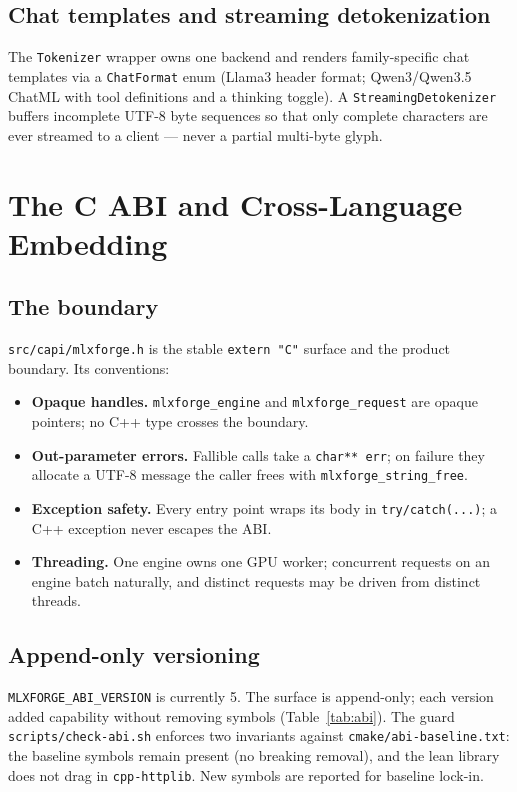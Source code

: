 \documentclass[11pt,a4paper]{report}
\newcommand{\code}[1]{\texttt{#1}}
\begin{document}
\section{Chat templates and streaming detokenization}
The \code{Tokenizer} wrapper owns one backend and renders family-specific chat
templates via a \code{ChatFormat} enum (Llama3 header format; Qwen3/Qwen3.5 ChatML
with tool definitions and a thinking toggle). A \code{StreamingDetokenizer} buffers
incomplete UTF-8 byte sequences so that only complete characters are ever streamed
to a client --- never a partial multi-byte glyph.

\chapter{The C ABI and Cross-Language Embedding}
\label{ch:abi}

\section{The boundary}
\code{src/capi/mlxforge.h} is the stable \code{extern "C"} surface and the product
boundary. Its conventions:
\begin{itemize}[nosep]
  \item \textbf{Opaque handles.} \code{mlxforge\_engine} and \code{mlxforge\_request}
        are opaque pointers; no C++ type crosses the boundary.
  \item \textbf{Out-parameter errors.} Fallible calls take a \code{char** err}; on
        failure they allocate a UTF-8 message the caller frees with
        \code{mlxforge\_string\_free}.
  \item \textbf{Exception safety.} Every entry point wraps its body in
        \code{try/catch(...)}; a C++ exception never escapes the ABI.
  \item \textbf{Threading.} One engine owns one GPU worker; concurrent requests on an
        engine batch naturally, and distinct requests may be driven from distinct
        threads.
\end{itemize}

\section{Append-only versioning}
\code{MLXFORGE\_ABI\_VERSION} is currently 5. The surface is append-only; each
version added capability without removing symbols (Table~\ref{tab:abi}). The guard
\code{scripts/check-abi.sh} enforces two invariants against
\code{cmake/abi-baseline.txt}: the baseline symbols remain present (no breaking
removal), and the lean library does not drag in \code{cpp-httplib}. New symbols are
reported for baseline lock-in.
\end{document}
